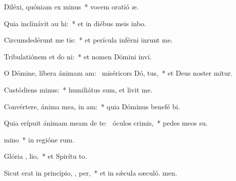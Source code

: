 \item Diléxi, quóniam ex minus~* vocem oratió æ.
\item Quia inclinávit au  hi:~* et in diébus meis inbo.
\item Circumdedérunt me  tis:~* et perícula inférni inrunt me.
\item Tribulatiónem et do ni:~* et nomen Dómini invi.
\item O Dómine, líbera ánimam am:~\pscross{} miséricors Dó,  tus,~* et Deus noster mitur.
\item Custódiens  minus:~* humiliátus sum, et livit me.
\item Convértere, ánima mea, in  am:~* quia Dóminus benefé bi.
\item Quia erípuit ánimam meam de te:~\pscross{} óculos   crimis,~* pedes meos  su.
\item {} mino~* in regióne rum.
\item Glória ,  lio,~* et Spirítu to.
\item Sicut erat in princípio,  ,  per,~* et in sǽcula sæculó. men.
